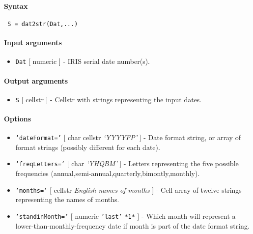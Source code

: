 


	\paragraph{Syntax}
 
 \begin{verbatim}
 S = dat2str(Dat,...)
 \end{verbatim}
 
 \paragraph{Input arguments}
 
 \begin{itemize}
 \item
   \texttt{Dat} {[} numeric {]} - IRIS serial date number(s).
 \end{itemize}
 
 \paragraph{Output arguments}
 
 \begin{itemize}
 \item
   \texttt{S} {[} cellstr {]} - Cellstr with strings representing the
   input dates.
 \end{itemize}
 
 \paragraph{Options}
 
 \begin{itemize}
 \item
   \texttt{'dateFormat='} {[} char \textbar{} cellstr \textbar{}
   \emph{`YYYYFP'} {]} - Date format string, or array of format strings
   (possibly different for each date).
 \item
   \texttt{'freqLetters='} {[} char \textbar{} \emph{`YHQBM'} {]} -
   Letters representing the five possible frequencies
   (annual,semi-annual,quarterly,bimontly,monthly).
 \item
   \texttt{'months='} {[} cellstr \textbar{} \emph{English names of
   months} {]} - Cell array of twelve strings representing the names of
   months.
 \item
   \texttt{'standinMonth='} {[} numeric \textbar{} \texttt{'last'}
   \textbar{} \texttt{*1*} {]} - Which month will represent a
   lower-than-monthly-frequency date if month is part of the date format
   string.
 \end{itemize}
 
